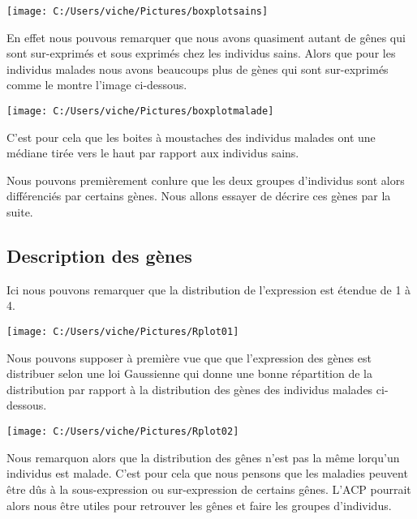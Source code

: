 \documentclass[]{article}
\begin{document}
\begin{center}\texttt{[image: C:/Users/viche/Pictures/boxplotsains]} \end{center}

En effet nous pouvous remarquer que nous avons quasiment autant de gênes
qui sont sur-exprimés et sous exprimés chez les individus sains. Alors
que pour les individus malades nous avons beaucoups plus de gènes qui
sont sur-exprimés comme le montre l'image ci-dessous.

\begin{center}\texttt{[image: C:/Users/viche/Pictures/boxplotmalade]} \end{center}

C'est pour cela que les boites à moustaches des individus malades ont
une médiane tirée vers le haut par rapport aux individus sains.

Nous pouvons premièrement conlure que les deux groupes d'individus sont
alors différenciés par certains gènes. Nous allons essayer de décrire
ces gènes par la suite.

\hypertarget{description-des-guxe8nes}{%
\subsection{Description des gènes}\label{description-des-guxe8nes}}

Ici nous pouvons remarquer que la distribution de l'expression est
étendue de 1 à 4.

\begin{center}\texttt{[image: C:/Users/viche/Pictures/Rplot01]} \end{center}

Nous pouvons supposer à première vue que que l'expression des gènes est
distribuer selon une loi Gaussienne qui donne une bonne répartition de
la distribution par rapport à la distribution des gènes des individus
malades ci-dessous.

\begin{center}\texttt{[image: C:/Users/viche/Pictures/Rplot02]} \end{center}

Nous remarquon alors que la distribution des gênes n'est pas la même
lorqu'un individus est malade. C'est pour cela que nous pensons que les
maladies peuvent être dûs à la sous-expression ou sur-expression de
certains gênes. L'ACP pourrait alors nous être utiles pour retrouver les
gênes et faire les groupes d'individus.
\end{document}
